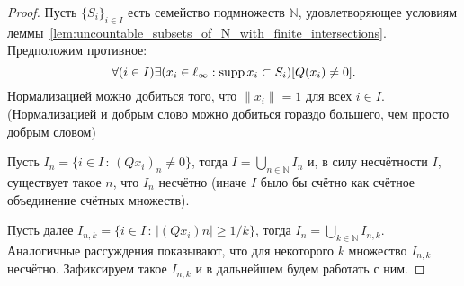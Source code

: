 \begin{proof}
	Пусть $\{S_i\}_{i \in I}$ есть семейство подмножеств $\mathbb{N}$,
	удовлетворяющее условиям леммы~\ref{lem:uncountable_subsets_of_N_with_finite_intersections}.
	Предположим противное:
	\begin{equation}
		\forall(i\in I)\exists(x_i \in \ell_\infty : \operatorname{supp} x_i \subset S_i)[Q(x_i) \neq 0]
		.
	\end{equation}
	Нормализацией можно добиться того, что $\|x_i\|=1$ для всех $i \in I$.
	(Нормализацией и добрым слово можно добиться гораздо большего, чем просто добрым словом)%
	
	Пусть $I_n = \{i \in I\,:\,(Qx_i)_n \neq 0\}$,
	тогда $I = \bigcup\limits_{n\in\mathbb{N}} I_n$
	и, в силу несчётности $I$, существует такое $n$,
	что $I_n$ несчётно
	(иначе $I$ было бы счётно как счётное объединение счётных множеств).
	
	Пусть далее $I_{n,k} = \{i \in I\,:\,|(Qx_i)n| \geq 1/k\}$,
	тогда $I_n = \bigcup\limits_{k\in\mathbb{N}} I_{n,k}$.
	Аналогичные рассуждения показывают, что для некоторого $k$ множество $I_{n,k}$ несчётно.
	Зафиксируем такое $I_{n,k}$ и в дальнейшем будем работать с ним.
	

\end{proof}
